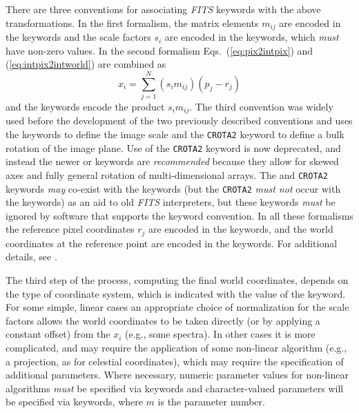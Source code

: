 \documentclass[onecolumn]{aa}
\begin{document}
There are three conventions for associating {\em FITS\/} keywords with the above
transformations.  
In the first formalism, the matrix
elements $m_{ij}$ are encoded in the  keywords and the scale
factors $s_i$ are encoded in the  keywords, which {\em must}
have non-zero values. In the second formalism Eqs.~(\ref{eq:pix2intpix}) and
(\ref{eq:intpix2intworld}) are combined as  
\begin{equation}
x_i = \sum_{j=1}^{N} (s_i m_{ij}) (p_j - r_j)  \label{eq:pix2intworld}
\end{equation}
and the
 keywords encode the product $s_i m_{ij}$.   
The third convention was widely used before the development
of the two previously described conventions and
uses the  keywords to define the image scale and the
{\tt CROTA2} keyword to define a bulk rotation of the image plane.  
Use of the {\tt CROTA2} keyword is now deprecated,  
and instead the newer
 or  keywords are {\em recommended} because they
allow for skewed axes and fully general rotation of multi-dimensional arrays. 
The
 and {\tt CROTA2} keywords {\em may} co-exist with the
 keywords 
(but the {\tt CROTA2} {\em must not} occur with the  keywords)
as an aid to old {\em FITS\/}
interpreters, but these keywords  {\em must} be
ignored by software that supports the  keyword convention.
 In all these formalisms the reference pixel coordinates $r_j$ are encoded in
the  keywords, and the world coordinates at the reference point
are encoded in the  keywords. For additional details, see \cite{greisen02}. 

The third step of the process, computing the final world coordinates, depends on
the type of coordinate system, which is indicated with the value of the
 keyword. For some simple, linear cases an appropriate choice of
normalization for the scale factors allows the world coordinates to be taken
directly (or by applying a constant offset) from the $x_i$ (e.g., some spectra).
In other cases it is more complicated, and may require the application of some
non-linear algorithm (e.g., a projection, as for celestial coordinates), which may
require the specification of additional parameters. Where necessary, numeric
parameter values for non-linear algorithms {\em must} be specified via
 keywords and character-valued parameters will be specified via
 keywords, where $m$ is the parameter number. 
\end{document}
